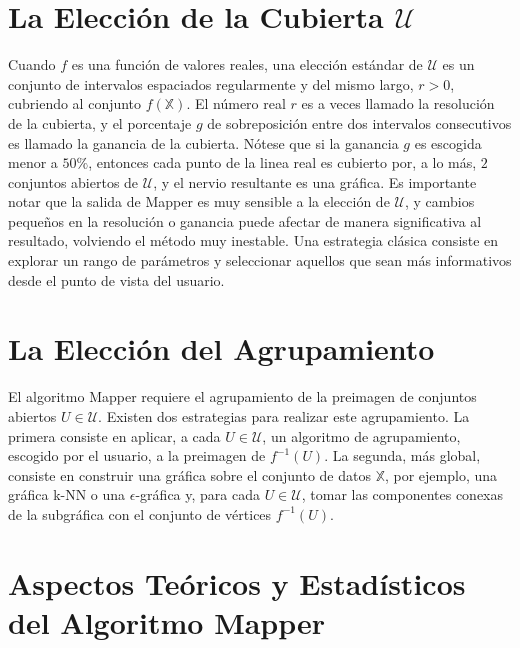 \section*{La Elecci\'on de la Cubierta $\mathcal{U}$}

Cuando $f$ es una funci\'on de valores reales, una elecci\'on est\'andar de $\mathcal{U}$
es un conjunto de intervalos espaciados regularmente y del mismo largo, $r>0$, cubriendo al conjunto
$f\left(\mathbb{X}\right)$. El n\'umero real $r$ es a veces llamado la resoluci\'on de
la cubierta, y el porcentaje $g$ de sobreposici\'on entre dos
intervalos consecutivos es llamado la ganancia de la cubierta.
N\'otese que si la ganancia $g$ es escogida menor a $50\%$, entonces cada punto de la linea real es
cubierto por, a lo m\'as, $2$ conjuntos abiertos de $\mathcal{U}$, y el nervio
resultante es una gr\'afica. Es importante notar que la salida de Mapper es muy
sensible a la elecci\'on de $\mathcal{U}$, y cambios
peque\~{n}os en la resoluci\'on o ganancia puede afectar de manera significativa al resultado, volviendo el
m\'etodo muy inestable. Una estrategia cl\'asica consiste en explorar un rango de par\'ametros y
seleccionar aquellos que sean m\'as informativos desde el punto de vista del usuario.

\section*{La Elecci\'on del Agrupamiento}

El algoritmo Mapper requiere el agrupamiento de la preimagen de conjuntos abiertos $U\in\mathcal{U}$.
Existen dos estrategias para realizar este agrupamiento. La primera consiste en aplicar, a cada
$U\in\mathcal{U}$, un algoritmo de agrupamiento, escogido por el usuario, a la preimagen de
$f^{-1}\left(U\right)$. La segunda, m\'as global, consiste en construir una gr\'afica sobre el
conjunto de datos $\mathbb{X}$, por ejemplo, una gr\'afica k-NN o una $\epsilon$-gr\'afica y, para cada
$U\in\mathcal{U}$, tomar las componentes conexas de la subgr\'afica con el conjunto de v\'ertices
$f^{-1}\left(U\right)$.

\section*{Aspectos Te\'oricos y Estad\'isticos del Algoritmo Mapper}

